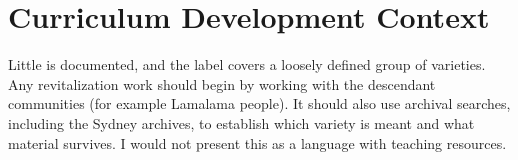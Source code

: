 \documentclass[12pt]{article}
\begin{document}
\section{Curriculum Development Context}
Little is documented, and the label covers a loosely defined group of varieties. Any revitalization work should begin by working with the descendant communities (for example Lamalama people). It should also use archival searches, including the Sydney archives, to establish which variety is meant and what material survives. I would not present this as a language with teaching resources.
\end{document}
